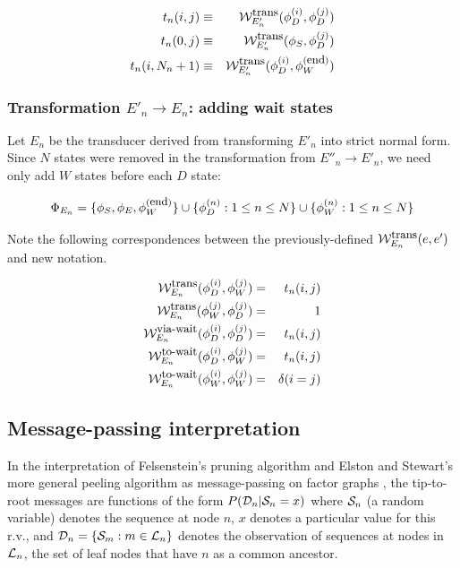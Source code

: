 \documentclass{article}
\newcommand{\seclabel}[1]{\label{sec.#1}}
\newcommand\States{\Phi}
\newcommand\statesof[1]{\States_{#1}}
\newcommand\startstate{\phi_S}
\newcommand\laststate{\phi_E}
\newcommand\weight{{\cal W}}
\newcommand\weightfunof[1]{\weight_{#1}}
\newcommand\transweightfun[1]{\weightfunof{#1}^{\mbox{\small trans}}}
\newcommand\transviawait[1]{\weightfunof{#1}^{\mbox{\small via-wait}}}
\newcommand\transtowait[1]{\weightfunof{#1}^{\mbox{\small to-wait}}}
\newcommand\leaves{{\cal L}}
\newcommand\outputs{{\cal D}}
\newcommand\outputn[1]{{\cal S}_{#1}}
\newcommand\newTransName[1]{t_{#1}}
\newcommand\numStates[1]{N_{#1}}
\newcommand\profiledelete[1]{\phi_D^{(#1)}}
\newcommand\profilewait[1]{\phi_W^{(#1)}}
\newcommand\profileterminate{\profilewait{\mbox{\small end}}}
\begin{document}
\begin{eqnarray*}
\newTransName{n}(i,j) & \equiv & \transweightfun{E'_n}(\profiledelete{i},\profiledelete{j}) \\
\newTransName{n}(0,j) & \equiv & \transweightfun{E'_n}(\startstate,\profiledelete{j})  \\
\newTransName{n}(i,\numStates{n}+1) & \equiv & \transweightfun{E'_n}(\profiledelete{i}, \profileterminate)  \\
\end{eqnarray*}




\subsubsection{Transformation $E'_n \to E_n$: adding wait states}

Let $E_n$ be the transducer derived from transforming $E'_n$ into strict normal form.  Since $N$ states were removed in the transformation from $E''_n \rightarrow E'_n$, we need only add $W$ states before each $D$ state:

\[
\statesof{E_n} = \{ \startstate, \laststate , \profileterminate \} \cup  \{\profiledelete{n} : 1 \leq n \leq N \}
\cup  \{\profilewait{n} : 1 \leq n \leq N \}
\]

Note the following correspondences between the previously-defined  $\transweightfun{E_n}(e,e')$ and new notation. 

\begin{eqnarray*}
\transweightfun{E_n}(\profiledelete{i},\profilewait{j}) & = & \newTransName{n}(i,j) \\
\transweightfun{E_n}(\profilewait{j},\profiledelete{j}) & = & 1 \\
\transviawait{E_n}(\profiledelete{i},\profiledelete{j}) & = & \newTransName{n}(i,j) \\
\transtowait{E_n}(\profiledelete{i},\profilewait{j}) & = & \newTransName{n}(i,j) \\
\transtowait{E_n}(\profilewait{i},\profilewait{j}) & = & \delta(i=j) \\
\end{eqnarray*}

\subsection{Message-passing interpretation}
\seclabel{MessagePassing}

In the interpretation of Felsenstein's pruning algorithm \cite{Felsenstein81} and Elston and Stewart's more general peeling algorithm \cite{ElstonStewart71} as message-passing on factor graphs \cite{KschischangEtAl98},
the tip-to-root messages are functions of the form
$P(\outputs_n|\outputn{n}=x)$ where $\outputn{n}$ (a random variable) denotes the sequence at node $n$,
$x$ denotes a particular value for this r.v.,
and
$\outputs_n = \{ \outputn{m} : m \in \leaves_n \}$
denotes the observation of sequences at nodes in $\leaves_n$, the set of leaf nodes that have $n$ as a common ancestor.
\end{document}
